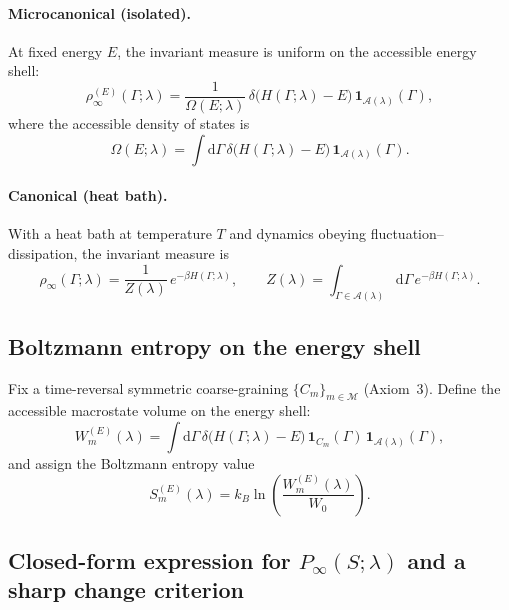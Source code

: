 \documentclass[11pt,a4paper]{article}
\begin{document}
\paragraph{Microcanonical (isolated).}
At fixed energy $E$, the invariant measure is uniform on the accessible energy shell:
\begin{equation}
\rho_{\infty}^{(E)}(\Gamma;\lambda)=
\frac{1}{\Omega(E;\lambda)}\,
\delta\!\bigl(H(\Gamma;\lambda)-E\bigr)\,
\mathbf{1}_{\mathcal{A}(\lambda)}(\Gamma),
\label{eq:rho_micro}
\end{equation}
where the accessible density of states is
\begin{equation}
\Omega(E;\lambda)=
\int \mathrm{d}\Gamma\,
\delta\!\bigl(H(\Gamma;\lambda)-E\bigr)\,
\mathbf{1}_{\mathcal{A}(\lambda)}(\Gamma).
\label{eq:Omega_entropy}
\end{equation}

\paragraph{Canonical (heat bath).}
With a heat bath at temperature $T$ and dynamics obeying fluctuation--dissipation,
the invariant measure is
\begin{equation}
\rho_{\infty}(\Gamma;\lambda)=
\frac{1}{Z(\lambda)}\,e^{-\beta H(\Gamma;\lambda)},
\qquad
Z(\lambda)=\int_{\Gamma\in\mathcal{A}(\lambda)} \mathrm{d}\Gamma\,
e^{-\beta H(\Gamma;\lambda)}.
\label{eq:rho_can}
\end{equation}

\subsection{Boltzmann entropy on the energy shell}

Fix a time-reversal symmetric coarse-graining $\{C_m\}_{m\in\mathcal{M}}$ (Axiom~3).
Define the accessible macrostate volume on the energy shell:
\begin{equation}
W_m^{(E)}(\lambda)=
\int \mathrm{d}\Gamma\,
\delta\!\bigl(H(\Gamma;\lambda)-E\bigr)\,
\mathbf{1}_{C_m}(\Gamma)\,
\mathbf{1}_{\mathcal{A}(\lambda)}(\Gamma),
\label{eq:WmE_entropy}
\end{equation}
and assign the Boltzmann entropy value
\begin{equation}
S_m^{(E)}(\lambda)=k_B\ln\!\left(\frac{W_m^{(E)}(\lambda)}{W_0}\right).
\label{eq:SmE_entropy}
\end{equation}

\subsection{Closed-form expression for $P_{\infty}(S;\lambda)$ and a sharp change criterion}
\end{document}
